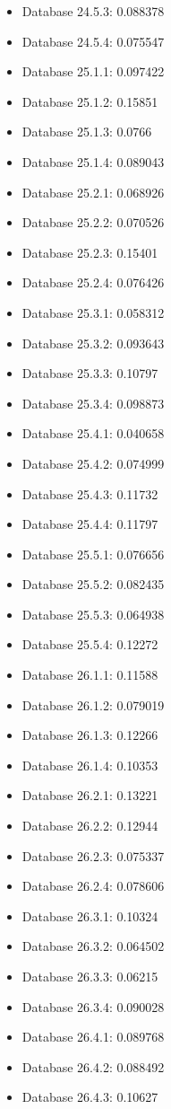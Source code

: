 \begin{itemize}
\item Database 24.5.3: 0.088378
\item Database 24.5.4: 0.075547
\item Database 25.1.1: 0.097422
\item Database 25.1.2: 0.15851
\item Database 25.1.3: 0.0766
\item Database 25.1.4: 0.089043
\item Database 25.2.1: 0.068926
\item Database 25.2.2: 0.070526
\item Database 25.2.3: 0.15401
\item Database 25.2.4: 0.076426
\item Database 25.3.1: 0.058312
\item Database 25.3.2: 0.093643
\item Database 25.3.3: 0.10797
\item Database 25.3.4: 0.098873
\item Database 25.4.1: 0.040658
\item Database 25.4.2: 0.074999
\item Database 25.4.3: 0.11732
\item Database 25.4.4: 0.11797
\item Database 25.5.1: 0.076656
\item Database 25.5.2: 0.082435
\item Database 25.5.3: 0.064938
\item Database 25.5.4: 0.12272
\item Database 26.1.1: 0.11588
\item Database 26.1.2: 0.079019
\item Database 26.1.3: 0.12266
\item Database 26.1.4: 0.10353
\item Database 26.2.1: 0.13221
\item Database 26.2.2: 0.12944
\item Database 26.2.3: 0.075337
\item Database 26.2.4: 0.078606
\item Database 26.3.1: 0.10324
\item Database 26.3.2: 0.064502
\item Database 26.3.3: 0.06215
\item Database 26.3.4: 0.090028
\item Database 26.4.1: 0.089768
\item Database 26.4.2: 0.088492
\item Database 26.4.3: 0.10627

\end{itemize}
